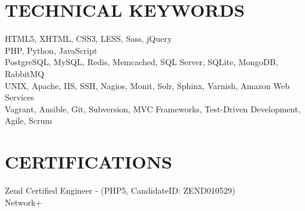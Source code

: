 \documentclass{res}
\begin{document}
\begin{resume}
\section{TECHNICAL KEYWORDS}

    HTML5, XHTML, CSS3, LESS, Sass, jQuery \\
    PHP, Python, JavaScript \\
    PostgreSQL, MySQL, Redis, Memcached, SQL Server, SQLite, MongoDB, RabbitMQ \\
    UNIX, Apache, IIS, SSH, Nagios, Monit, Solr, Sphinx, Varnish, Amazon Web Services \\
    Vagrant, Ansible, Git, Subversion, MVC Frameworks, Test-Driven Development, Agile, Scrum


\section{CERTIFICATIONS}
    Zend Certified Engineer - (PHP5, CandidateID: ZEND010529) \\
    Network+

\end{resume}
\end{document}
